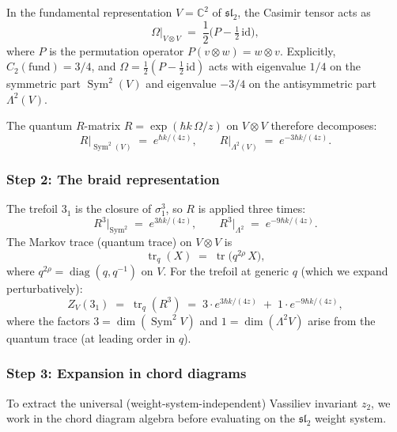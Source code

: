 \documentclass[11pt]{article}
\newcommand{\fsl}{\mathfrak{sl}}
\newcommand{\C}{\mathbb{C}}
\DeclareMathOperator{\Sym}{Sym}
\DeclareMathOperator{\diag}{diag}
\begin{document}
In the fundamental representation $V = \C^2$ of $\fsl_2$, the
Casimir tensor acts as
\begin{equation}\label{eq:casimir-fund}
  \Omega\big|_{V \otimes V}
  \;=\;
  \frac{1}{2}\bigl(P - \tfrac{1}{2}\,\mathrm{id}\bigr),
\end{equation}
where $P$ is the permutation operator $P(v \otimes w) = w \otimes v$.
Explicitly, $C_2(\mathrm{fund}) = 3/4$, and
$\Omega = \frac{1}{2}(P - \frac{1}{2}\,\mathrm{id})$ acts with
eigenvalue $1/4$ on the symmetric part $\Sym^2(V)$
and eigenvalue $-3/4$ on the antisymmetric part
$\Lambda^2(V)$.

The quantum $R$-matrix $R = \exp(\hbar k\,\Omega/z)$ on
$V \otimes V$ therefore decomposes:
\begin{equation}\label{eq:R-eigenvalues}
  R\big|_{\Sym^2(V)}
  \;=\;
  e^{\hbar k/(4z)},
  \qquad
  R\big|_{\Lambda^2(V)}
  \;=\;
  e^{-3\hbar k/(4z)}.
\end{equation}

\subsubsection{Step 2: The braid representation}

The trefoil $3_1$ is the closure of $\sigma_1^3$, so
$R$ is applied three times:
\begin{equation}\label{eq:R-cubed}
  R^3\big|_{\Sym^2}
  \;=\;
  e^{3\hbar k/(4z)},
  \qquad
  R^3\big|_{\Lambda^2}
  \;=\;
  e^{-9\hbar k/(4z)}.
\end{equation}
The Markov trace (quantum trace) on $V \otimes V$ is
\[
  \operatorname{tr}_q(X)
  \;=\;
  \operatorname{tr}\bigl(q^{2\rho}\, X\bigr),
\]
where $q^{2\rho} = \diag(q, q^{-1})$ on $V$.
For the trefoil at generic $q$ (which we expand perturbatively):
\begin{equation}\label{eq:markov-trace}
  Z_{V}(3_1)
  \;=\;
  \operatorname{tr}_q(R^3)
  \;=\;
  3 \cdot e^{3\hbar k/(4z)}
  \;+\;
  1 \cdot e^{-9\hbar k/(4z)},
\end{equation}
where the factors $3 = \dim(\Sym^2 V)$ and
$1 = \dim(\Lambda^2 V)$ arise from the quantum trace
(at leading order in $q$).

\subsubsection{Step 3: Expansion in chord diagrams}

To extract the universal (weight-system-independent) Vassiliev
invariant $z_2$, we work in the chord diagram algebra before
evaluating on the $\fsl_2$ weight system.
\end{document}
